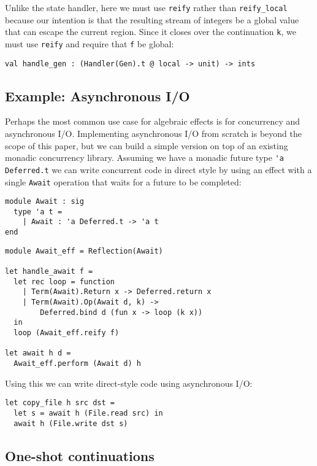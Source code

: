 \documentclass[acmsmall, screen, nonacm]{acmart}
\theoremstyle{definition}
\begin{document}
Unlike the state handler, here we must use
\lstinline[style=oxcaml]{reify} rather than
\lstinline[style=oxcaml]{reify_local} because our intention is that the
resulting stream of integers be a global value that can escape the
current region. Since it closes over the continuation
\lstinline[style=oxcaml]{k}, we must use \lstinline[style=oxcaml]{reify}
and require that \lstinline[style=oxcaml]{f} be global:
\begin{lstlisting}[style=oxcaml]
val handle_gen : (Handler(Gen).t @ local -> unit) -> ints
\end{lstlisting}

\subsection{Example: Asynchronous I/O}

Perhaps the most common use case for algebraic effects is for
concurrency and asynchronous I/O. Implementing asynchronous I/O from
scratch is beyond the scope of this paper, but we can build a simple
version on top of an existing monadic concurrency library. Assuming we
have a monadic future type \lstinline[style=oxcaml]{'a Deferred.t} we can
write concurrent code in direct style by using an effect with a single
\lstinline[style=oxcaml]{Await} operation that waits for a future to be
completed:
\begin{lstlisting}[style=oxcaml]
module Await : sig
  type 'a t =
    | Await : 'a Deferred.t -> 'a t
end
\end{lstlisting}

\begin{lstlisting}[style=oxcaml]
module Await_eff = Reflection(Await)

let handle_await f =
  let rec loop = function
    | Term(Await).Return x -> Deferred.return x
    | Term(Await).Op(Await d, k) ->
        Deferred.bind d (fun x -> loop (k x))
  in
  loop (Await_eff.reify f)

let await h d =
  Await_eff.perform (Await d) h
\end{lstlisting}

Using this we can write direct-style code using asynchronous I/O:
\begin{lstlisting}[style=oxcaml]
let copy_file h src dst =
  let s = await h (File.read src) in
  await h (File.write dst s)
\end{lstlisting}

\subsection{One-shot continuations}
\end{document}
